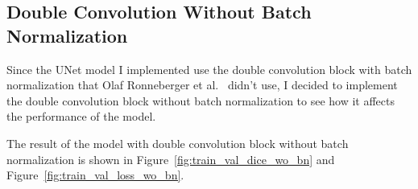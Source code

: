 \subsection{Double Convolution Without Batch Normalization}

Since the UNet model I implemented use the double convolution block with batch normalization that Olaf Ronneberger et al.~\cite{UNet} didn't use, I decided to implement the double convolution block without batch normalization to see how it affects the performance of the model.

The result of the model with double convolution block without batch normalization is shown in Figure~\ref{fig:train_val_dice_wo_bn} and Figure~\ref{fig:train_val_loss_wo_bn}.

